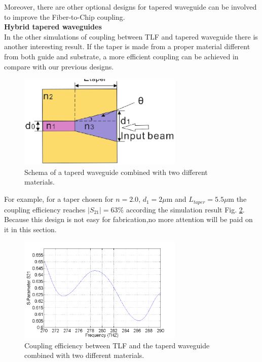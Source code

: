 Moreover, there are other optional designs for tapered waveguide can be involved to improve the Fiber-to-Chip coupling.\\
\textbf{Hybrid tapered waveguides}\\  
In the other simulations of coupling between TLF and tapered waveguide there is another interesting result. If the taper is made from a proper material different from both guide and substrate, a more efficient coupling can be achieved in compare with our previous designs. 
\begin{figure}[!ht]
\centering
\includegraphics[width=0.7\textwidth]{bilder/tapered_waveguide_others}
\caption{Schema of a taperd waveguide combined with two different materials.}
\label{fig:tapered_waveguide_others}
\end{figure}
For example, for a taper chosen for $n=2.0$, $d_{1}=2\mu$m and $L_{taper}=5.5\mu$m the coupling efficiency reaches $|S_{21}|=63\%$ according the simulation result Fig. \ref{fig:tapered_waveguide_others_coupling}.  Because this design is not easy for fabrication,no more attention will be paid on it in this section.   
\begin{figure}[!ht]
\centering
\includegraphics[width=0.7\textwidth]{bilder/s21_tapered_waveguide_others}
\caption{Coupling efficiency between TLF and the taperd waveguide combined with two different materials.}
\label{fig:tapered_waveguide_others_coupling}
\end{figure}



